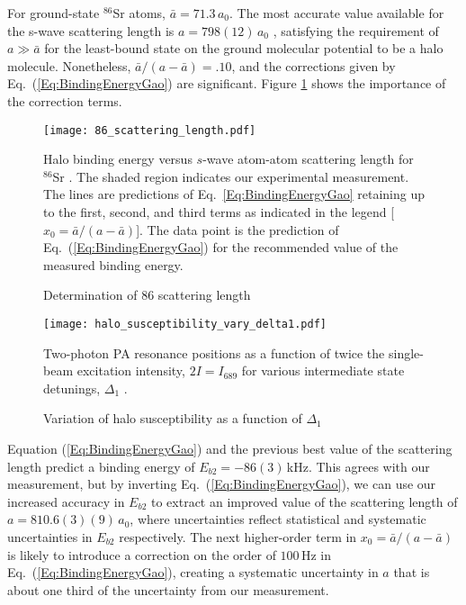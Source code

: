 For ground-state $^{86}$Sr atoms, $\bar{a}=71.3$\,$a_0$. The most accurate value available for the s-wave scattering length is $a=798 (12)$\,$a_0$ \cite{skt10}, satisfying the requirement of $a\gg \bar{a}$ for the least-bound state on the ground molecular potential to be a halo molecule. Nonetheless, ${\bar{a}}/({a-\bar{a}})=.10$, and the corrections given by Eq.\ (\ref{Eq:BindingEnergyGao}) are significant. Figure \ref{Fig:HaloBindingEnergy} shows the importance of the correction terms.

\begin{figure} \label{Fig:HaloBindingEnergy}
\centerline{
  \texttt{[image: 86\_scattering\_length.pdf]}}
  \caption{Determination of 86 scattering length}{Halo binding energy versus $s$-wave atom-atom scattering length for $^{86}$Sr . The shaded region indicates our experimental measurement. The lines are predictions of Eq.\ \ref{Eq:BindingEnergyGao} retaining up to the first, second, and third terms as indicated in the legend [$x_0={\bar{a}}/({a-\bar{a}})$]. The data point is the prediction of Eq.\ (\ref{Eq:BindingEnergyGao}) for the recommended value of the measured binding energy.}
  
\end{figure}

\begin{figure} \label{Fig:ShiftsofLinesWithIntensity}
\centerline{
  \texttt{[image: halo\_susceptibility\_vary\_delta1.pdf]}}
  \caption{Variation of halo susceptibility as a function of $\Delta_1$}{Two-photon PA resonance positions as a function of twice the single-beam excitation intensity, $2I=I_{689}$ for various intermediate state detunings, $\Delta_1$ .}
\end{figure}

Equation (\ref{Eq:BindingEnergyGao}) and the previous best value of the scattering length \cite{skt10} predict a binding energy of $E_{b2}=-86(3)$\,kHz. This agrees with our measurement, but by inverting Eq.\ (\ref{Eq:BindingEnergyGao}), we can use our increased accuracy in $E_{b2}$ to extract an improved value of the scattering length of $a=810.6(3)(9)$\,$a_0$, where uncertainties reflect statistical and systematic uncertainties in $E_{b2}$ respectively. The next higher-order term in $x_0={\bar{a}}/({a-\bar{a}})$ is likely to introduce a correction on the order of $100$\,Hz in Eq.\ (\ref{Eq:BindingEnergyGao}), creating a systematic uncertainty in $a$ that is about one third of the uncertainty from our measurement.


